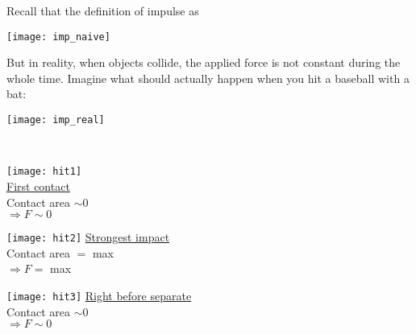 \documentclass[class=article, crop=false, 12pt]{standalone}
\begin{document}
Recall that the definition of impulse as \\[-2.5em]
\begin{center}
    \begin{minipage}{0.5\textwidth}
    \end{minipage}
    \hspace{0.05\textwidth}
    \begin{minipage}{0.35\textwidth}
        \centering
        \texttt{[image: imp\_naive]}
    \end{minipage}
    \hfill
\end{center}

But in reality, when objects collide, the applied force is not constant during the whole time.
Imagine what should actually happen when you hit a baseball with a bat:


\begin{center}
    \begin{minipage}{0.4\linewidth}
        \centering
        \texttt{[image: imp\_real]}
    \end{minipage}
    \begin{minipage}{0.4\linewidth}
        \centering
    \end{minipage}
    \\[1em]
    \begin{minipage}{0.3\linewidth}
        \centering
        \texttt{[image: hit1]}\\
        \ul{First contact} \\
        Contact area $\sim 0$ \\
        $\Rightarrow F\sim 0$ 
    \end{minipage}
    \begin{minipage}{0.3\linewidth}
        \centering
        \texttt{[image: hit2]}
        \ul{Strongest impact} \\
        Contact area $=$ max \\
        $\Rightarrow F= $ max 
    \end{minipage}
    \begin{minipage}{0.3\linewidth}
        \centering
        \texttt{[image: hit3]}
        \ul{Right before separate} \\
        Contact area $\sim 0$ \\
        $\Rightarrow F\sim 0$ 
    \end{minipage}
\end{center}
\end{document}
